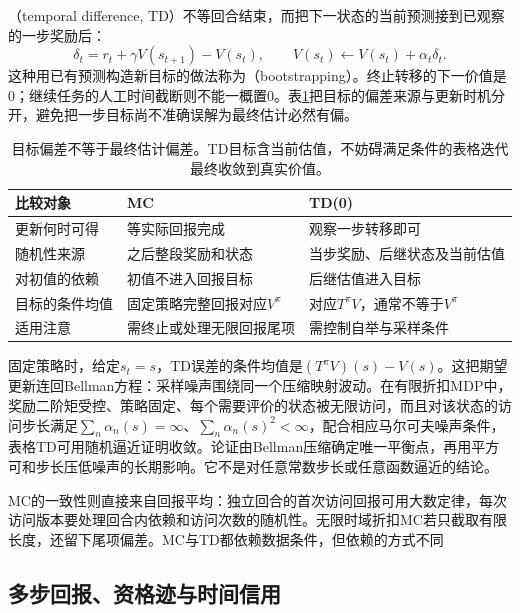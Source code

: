 （temporal difference, TD）不等回合结束，而把下一状态的当前预测接到已观察的一步奖励后：
\begin{equation}
  \delta_t=r_t+\gamma V(s_{t+1})-V(s_t),\qquad
  V(s_t)\leftarrow V(s_t)+\alpha_t\delta_t .
  \label{eq:rl-learning-td-zero}
\end{equation}
这种用已有预测构造新目标的做法称为（bootstrapping）。终止转移的下一价值是0；继续任务的人工时间截断则不能一概置0。表\ref{tab:rl-learning-mc-td}把目标的偏差来源与更新时机分开，避免把一步目标尚不准确误解为最终估计必然有偏。

\begin{table}[htbp]
  \centering
  \small
  \begin{tabularx}{\linewidth}{>{\raggedright\arraybackslash}p{22mm} >{\raggedright\arraybackslash}X >{\raggedright\arraybackslash}X}
    \toprule
    比较对象 & MC & TD(0) \\
    \midrule
    更新何时可得 & 等实际回报完成 & 观察一步转移即可 \\
    随机性来源 & 之后整段奖励和状态 & 当步奖励、后继状态及当前估值 \\
    对初值的依赖 & 初值不进入回报目标 & 后继估值进入目标 \\
    目标的条件均值 & 固定策略完整回报对应$V^\pi$ & 对应$T^\pi V$，通常不等于$V^\pi$ \\
    适用注意 & 需终止或处理无限回报尾项 & 需控制自举与采样条件 \\
    \bottomrule
  \end{tabularx}
  \caption{目标偏差不等于最终估计偏差。TD目标含当前估值，不妨碍满足条件的表格迭代最终收敛到真实价值。}
  \label{tab:rl-learning-mc-td}
\end{table}

固定策略时，给定$s_t=s$，TD误差的条件均值是$(T^\pi V)(s)-V(s)$。这把期望更新连回Bellman方程：采样噪声围绕同一个压缩映射波动。在有限折扣MDP中，奖励二阶矩受控、策略固定、每个需要评价的状态被无限访问，而且对该状态的访问步长满足$\sum_n\alpha_n(s)=\infty$、$\sum_n\alpha_n(s)^2<\infty$，配合相应马尔可夫噪声条件，表格TD可用随机逼近证明收敛。论证由Bellman压缩确定唯一平衡点，再用平方可和步长压低噪声的长期影响。它不是对任意常数步长或任意函数逼近的结论。

MC的一致性则直接来自回报平均：独立回合的首次访问回报可用大数定律，每次访问版本要处理回合内依赖和访问次数的随机性。无限时域折扣MC若只截取有限长度，还留下尾项偏差。MC与TD都依赖数据条件，但依赖的方式不同

\subsection{多步回报、资格迹与时间信用}
\label{sec:rl-learning-traces}

